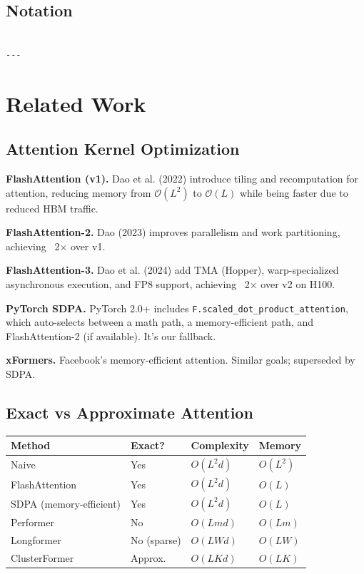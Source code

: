\subsection{Notation}

\begin{lstlisting}

---
\end{lstlisting}

\section{Related Work}

\subsection{Attention Kernel Optimization}

\textbf{FlashAttention (v1).} Dao et al. (2022) introduce tiling and 
recomputation for attention, reducing memory from $\mathcal{O}(L^2)$ to 
$\mathcal{O}(L)$ while being faster due to reduced HBM traffic.

\textbf{FlashAttention-2.} Dao (2023) improves parallelism and work partitioning, 
achieving ~2$\times$ over v1.

\textbf{FlashAttention-3.} Dao et al. (2024) add TMA (Hopper), warp-specialized 
asynchronous execution, and FP8 support, achieving ~2$\times$ over v2 on H100.

\textbf{PyTorch SDPA.} PyTorch 2.0+ includes \texttt{F.scaled\_dot\_product\_attention}, 
which auto-selects between a math path, a memory-efficient path, and 
FlashAttention-2 (if available). It's our fallback.

\textbf{xFormers.} Facebook's memory-efficient attention. Similar goals; 
superseded by SDPA.

\subsection{Exact vs Approximate Attention}

\begin{table}[H]
\centering
\small
\begin{tabular}{llll}
\toprule
\textbf{Method} & \textbf{Exact?} & \textbf{Complexity} & \textbf{Memory} \\
\midrule
Naive & Yes & $O(L^2 d)$ & $O(L^2)$ \\
FlashAttention & Yes & $O(L^2 d)$ & $O(L)$ \\
SDPA (memory-efficient) & Yes & $O(L^2 d)$ & $O(L)$ \\
Performer & No & $O(L m d)$ & $O(L m)$ \\
Longformer & No (sparse) & $O(L W d)$ & $O(L W)$ \\
ClusterFormer & Approx. & $O(L K d)$ & $O(L K)$ \\
\bottomrule
\end{tabular}
\end{table}

